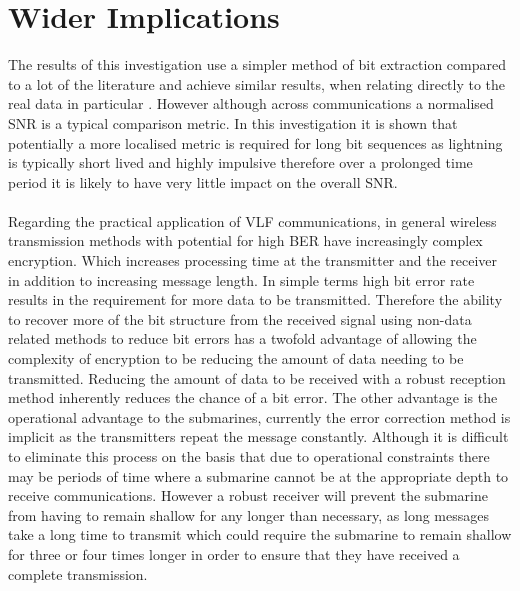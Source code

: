 \section{Wider Implications}
The results of this investigation use a simpler method of bit extraction compared to a lot of the literature and achieve similar results, when relating directly to the real data in particular \cite{Yang2016}. However although across communications a normalised SNR is a typical comparison metric. In this investigation it is shown that potentially a more localised metric is required for long bit sequences as lightning is typically short lived and highly impulsive therefore over a prolonged time period it is likely to have very little impact on the overall SNR. 
\\\\
Regarding the practical application of VLF communications, in general wireless transmission methods with potential for high BER have increasingly complex encryption. Which increases processing time at the transmitter and the receiver in addition to increasing message length. In simple terms high bit error rate results in the requirement for more data to be transmitted. Therefore the ability to recover more of the bit structure from the received signal using non-data related methods to reduce bit errors has a twofold advantage of allowing the complexity of encryption to be reducing the amount of data needing to be transmitted. Reducing the amount of data to be received with a robust reception method inherently reduces the chance of a bit error. The other advantage is the operational advantage to the submarines, currently the error correction method is implicit as the transmitters repeat the message constantly. Although it is difficult to eliminate this process on the basis that due to operational constraints there may be periods of time where a submarine cannot be at the appropriate depth to receive communications. However a robust receiver will prevent the submarine from having to remain shallow for any longer than necessary, as long messages take a long time to transmit which could require the submarine to remain shallow for three or four times longer in order to ensure that they have received a complete transmission.